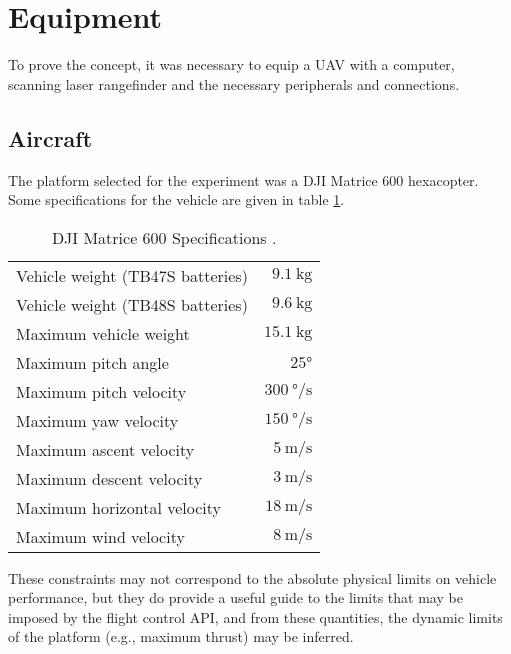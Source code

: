 \label{chapter:Methods}

\section{Equipment}

To prove the concept, it was necessary to equip a UAV with a computer, scanning laser rangefinder and the necessary peripherals and connections.

\subsection{Aircraft}

The platform selected for the experiment was a DJI Matrice 600 hexacopter. Some specifications for the vehicle are given in table \ref{table:djispecs}.

\begin{table}
\begin{center}
\begin{tabular}{ l r }
\hline
Vehicle weight (TB47S batteries) & $\SI{9.1}\kg$ \\ 
Vehicle weight (TB48S batteries) & $\SI{9.6}\kg$ \\
Maximum vehicle weight & $\SI{15.1}\kg$ \\
Maximum pitch angle & $\ang{25}$ \\
Maximum pitch velocity & $\SI{300}{\degree\per\second}$ \\
Maximum yaw velocity & $\SI{150}{\degree\per\second}$ \\
Maximum ascent velocity & $\SI{5}{\metre\per\second}$ \\
Maximum descent velocity & $\SI{3}{\metre\per\second}$ \\
Maximum horizontal velocity & $\SI{18}{\metre\per\second}$ \\
Maximum wind velocity & $\SI{8}{\metre\per\second}$ \\
\hline
\end{tabular}
\end{center}
\caption{DJI Matrice 600 Specifications \cite{DJI2017}.}
\label{table:djispecs}
\end{table}

These constraints may not correspond to the absolute physical limits on vehicle performance, but they do provide a useful guide to the limits that may be imposed by the flight control API, and from these quantities, the dynamic limits of the platform (e.g., maximum thrust) may be inferred.

